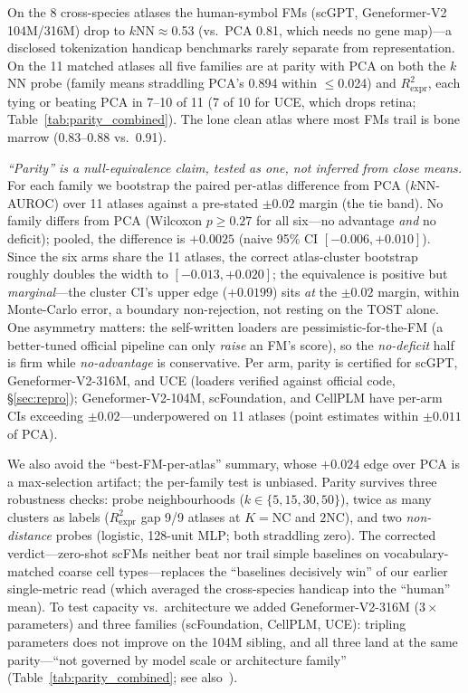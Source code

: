 \documentclass[journal]{IEEEtran}
\begin{document}
On the 8 cross-species atlases the human-symbol FMs (scGPT, Geneformer-V2 104M/316M) drop to $k$NN${\approx}$0.53 (vs.\ PCA 0.81, which needs no gene map)---a disclosed tokenization handicap benchmarks rarely separate from representation. On the 11 matched atlases all five families are at parity with PCA on both the $k$NN probe (family means straddling PCA's 0.894 within $\le$0.024) and $R^2_{\mathrm{expr}}$, each tying or beating PCA in 7--10 of 11 (7 of 10 for UCE, which drops retina; Table~\ref{tab:parity_combined}). The lone clean atlas where most FMs trail is bone marrow (0.83--0.88 vs.\ 0.91).

\emph{``Parity'' is a null-equivalence claim, tested as one, not inferred from close means.} For each family we bootstrap the paired per-atlas difference from PCA ($k$NN-AUROC) over 11 atlases against a pre-stated $\pm0.02$ margin (the tie band). No family differs from PCA (Wilcoxon $p\ge0.27$ for all six---no advantage \emph{and} no deficit); pooled, the difference is $+0.0025$ (naive 95\% CI $[-0.006,+0.010]$). Since the six arms share the 11 atlases, the correct atlas-cluster bootstrap roughly doubles the width to $[-0.013,+0.020]$; the equivalence is positive but \emph{marginal}---the cluster CI's upper edge ($+0.0199$) sits \emph{at} the $\pm0.02$ margin, within Monte-Carlo error, a boundary non-rejection, not resting on the TOST alone. One asymmetry matters: the self-written loaders are pessimistic-for-the-FM (a better-tuned official pipeline can only \emph{raise} an FM's score), so the \emph{no-deficit} half is firm while \emph{no-advantage} is conservative. Per arm, parity is certified for scGPT, Geneformer-V2-316M, and UCE (loaders verified against official code, \S\ref{sec:repro}); Geneformer-V2-104M, scFoundation, and CellPLM have per-arm CIs exceeding $\pm0.02$---underpowered on 11 atlases (point estimates within $\pm0.011$ of PCA).

We also avoid the ``best-FM-per-atlas'' summary, whose $+0.024$ edge over PCA is a max-selection artifact; the per-family test is unbiased. Parity survives three robustness checks: probe neighbourhoods ($k\in\{5,15,30,50\}$), twice as many clusters as labels ($R^2_{\mathrm{expr}}$ gap 9/9 atlases at $K{=}\mathrm{NC}$ and $2\mathrm{NC}$), and two \emph{non-distance} probes (logistic, 128-unit MLP; both straddling zero). The corrected verdict---zero-shot scFMs neither beat nor trail simple baselines on vocabulary-matched coarse cell types---replaces the ``baselines decisively win'' of our earlier single-metric read (which averaged the cross-species handicap into the ``human'' mean). To test capacity vs.\ architecture we added Geneformer-V2-316M ($3\times$ parameters) and three families (scFoundation, CellPLM, UCE): tripling parameters does not improve on the 104M sibling, and all three land at the same parity---``not governed by model scale or architecture family'' (Table~\ref{tab:parity_combined}; see also~\cite{denadel2026}).
\end{document}
